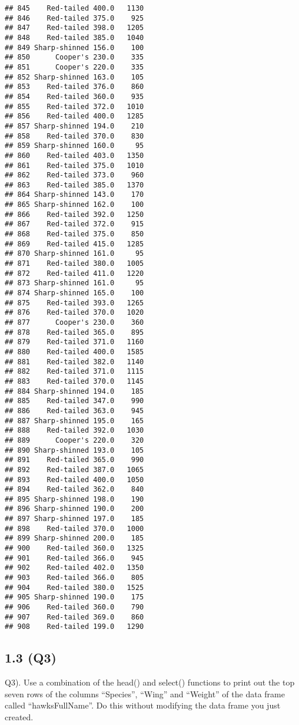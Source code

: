 \documentclass[
]{article}
\begin{document}
\begin{verbatim}
## 845    Red-tailed 400.0   1130
## 846    Red-tailed 375.0    925
## 847    Red-tailed 398.0   1205
## 848    Red-tailed 385.0   1040
## 849 Sharp-shinned 156.0    100
## 850      Cooper's 230.0    335
## 851      Cooper's 220.0    335
## 852 Sharp-shinned 163.0    105
## 853    Red-tailed 376.0    860
## 854    Red-tailed 360.0    935
## 855    Red-tailed 372.0   1010
## 856    Red-tailed 400.0   1285
## 857 Sharp-shinned 194.0    210
## 858    Red-tailed 370.0    830
## 859 Sharp-shinned 160.0     95
## 860    Red-tailed 403.0   1350
## 861    Red-tailed 375.0   1010
## 862    Red-tailed 373.0    960
## 863    Red-tailed 385.0   1370
## 864 Sharp-shinned 143.0    170
## 865 Sharp-shinned 162.0    100
## 866    Red-tailed 392.0   1250
## 867    Red-tailed 372.0    915
## 868    Red-tailed 375.0    850
## 869    Red-tailed 415.0   1285
## 870 Sharp-shinned 161.0     95
## 871    Red-tailed 380.0   1005
## 872    Red-tailed 411.0   1220
## 873 Sharp-shinned 161.0     95
## 874 Sharp-shinned 165.0    100
## 875    Red-tailed 393.0   1265
## 876    Red-tailed 370.0   1020
## 877      Cooper's 230.0    360
## 878    Red-tailed 365.0    895
## 879    Red-tailed 371.0   1160
## 880    Red-tailed 400.0   1585
## 881    Red-tailed 382.0   1140
## 882    Red-tailed 371.0   1115
## 883    Red-tailed 370.0   1145
## 884 Sharp-shinned 194.0    185
## 885    Red-tailed 347.0    990
## 886    Red-tailed 363.0    945
## 887 Sharp-shinned 195.0    165
## 888    Red-tailed 392.0   1030
## 889      Cooper's 220.0    320
## 890 Sharp-shinned 193.0    105
## 891    Red-tailed 365.0    990
## 892    Red-tailed 387.0   1065
## 893    Red-tailed 400.0   1050
## 894    Red-tailed 362.0    840
## 895 Sharp-shinned 198.0    190
## 896 Sharp-shinned 190.0    200
## 897 Sharp-shinned 197.0    185
## 898    Red-tailed 370.0   1000
## 899 Sharp-shinned 200.0    185
## 900    Red-tailed 360.0   1325
## 901    Red-tailed 366.0    945
## 902    Red-tailed 402.0   1350
## 903    Red-tailed 366.0    805
## 904    Red-tailed 380.0   1525
## 905 Sharp-shinned 190.0    175
## 906    Red-tailed 360.0    790
## 907    Red-tailed 369.0    860
## 908    Red-tailed 199.0   1290
\end{verbatim}

\subsection{1.3 (Q3)}\label{q3}

Q3). Use a combination of the head() and select() functions to print out
the top seven rows of the columns ``Species'', ``Wing'' and ``Weight''
of the data frame called ``hawksFullName''. Do this without modifying
the data frame you just created.
\end{document}
